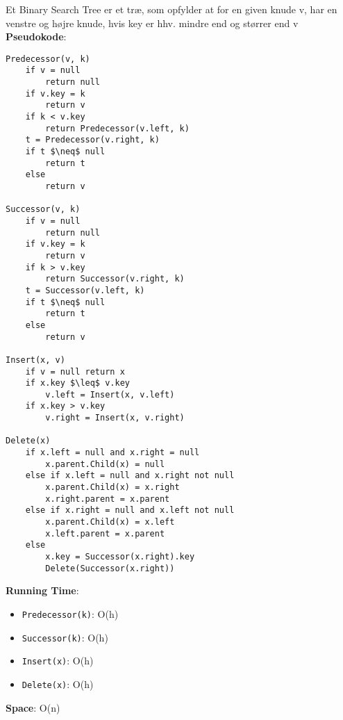 Et Binary Search Tree er et træ, som opfylder at for en given knude v, har en venstre og højre knude, hvis key er hhv. mindre end og størrer end v\\
\textbf{Pseudokode}:
\begin{lstlisting}[frame=single, mathescape=true]
Predecessor(v, k)
	if v = null
		return null
	if v.key = k
		return v
	if k < v.key
		return Predecessor(v.left, k)
	t = Predecessor(v.right, k)
	if t $\neq$ null
		return t
	else
		return v

Successor(v, k)
	if v = null
		return null
	if v.key = k
		return v
	if k > v.key
		return Successor(v.right, k)
	t = Successor(v.left, k)
	if t $\neq$ null
		return t
	else
		return v

Insert(x, v)
	if v = null return x
	if x.key $\leq$ v.key
		v.left = Insert(x, v.left)
	if x.key > v.key
		v.right = Insert(x, v.right)

Delete(x)
	if x.left = null and x.right = null
		x.parent.Child(x) = null
	else if x.left = null and x.right not null
		x.parent.Child(x) = x.right
		x.right.parent = x.parent
	else if x.right = null and x.left not null
		x.parent.Child(x) = x.left
		x.left.parent = x.parent
	else
		x.key = Successor(x.right).key
		Delete(Successor(x.right))
\end{lstlisting}
\newpage
\noindent\textbf{Running Time}:
\begin{itemize}
	\item \texttt{Predecessor(k)}: O(h)
	\item \texttt{Successor(k)}: O(h)
	\item \texttt{Insert(x)}: O(h)
	\item \texttt{Delete(x)}: O(h)
\end{itemize}
\textbf{Space}: O(n)